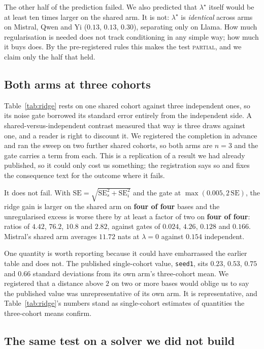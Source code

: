 The other half of the prediction failed. We also predicted that $\lambda^\star$ itself would be at least ten times
larger on the shared arm. It is not: $\lambda^\star$ is \emph{identical}
across arms on Mistral, Qwen and Yi ($0.13$, $0.13$, $0.30$), separating
only on Llama. How much regularisation is needed does not track
conditioning in any simple way; how much it buys does. By the
pre-registered rules this makes the test \textsc{partial}, and we claim
only the half that held.

\subsection{Both arms at three cohorts}
\label{subsec:shared-arm}

Table~\ref{tab:ridge} rests on one shared cohort against three independent
ones, so its noise gate borrowed its standard error entirely from the
independent side. A shared-versus-independent contrast measured that way is
three draws against one, and a reader is right to discount it. We registered
the completion in advance and ran the sweep on two further shared cohorts, so
both arms are $n = 3$ and the gate carries a term from each. This is a
replication of a result we had already published, so it could only cost us
something; the registration says so and fixes the consequence text for the
outcome where it fails.

It does not fail. With
$\mathrm{SE} = \sqrt{\mathrm{SE}_s^2 + \mathrm{SE}_i^2}$ and the gate at
$\max(0.005, 2\,\mathrm{SE})$, the ridge gain is larger on the shared arm on
\textbf{four of four} bases and the unregularised excess is worse there by at
least a factor of two on \textbf{four of four}: ratios of $4.42$, $76.2$,
$10.8$ and $2.82$, against gates of $0.024$, $4.26$, $0.128$ and $0.166$.
Mistral's shared arm averages $11.72$ nats at $\lambda = 0$ against $0.154$
independent.

One quantity is worth reporting because it could have embarrassed the earlier
table and does not. The published single-cohort value, \texttt{seed1}, sits
$0.23$, $0.53$, $0.75$ and $0.66$ standard deviations from its own arm's
three-cohort mean. We registered that a distance above $2$ on two or more
bases would oblige us to say the published value was unrepresentative of its
own arm. It is representative, and Table~\ref{tab:ridge}'s numbers stand as
single-cohort estimates of quantities the three-cohort means confirm.

\subsection{The same test on a solver we did not build}
\label{subsec:regmean}

